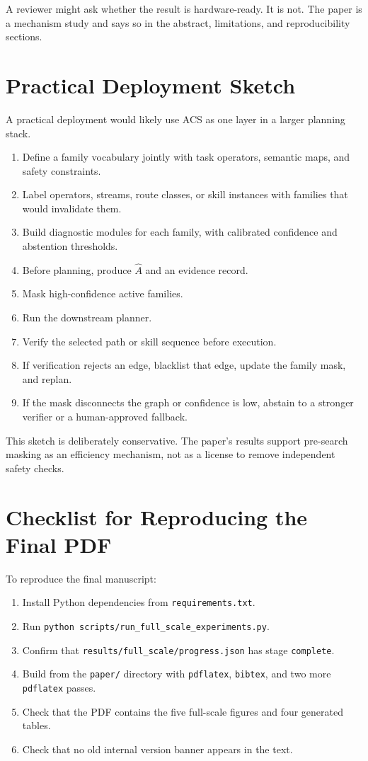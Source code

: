 \documentclass{article}
\newcommand{\ACS}{\textsc{ACS}}
\newcommand{\Ahat}{\hat{A}}
\begin{document}
A reviewer might ask whether the result is hardware-ready. It is not. The paper is a mechanism study and says so in the abstract, limitations, and reproducibility sections.

\section{Practical Deployment Sketch}

A practical deployment would likely use \ACS{} as one layer in a larger planning stack.
\begin{enumerate}
    \item Define a family vocabulary jointly with task operators, semantic maps, and safety constraints.
    \item Label operators, streams, route classes, or skill instances with families that would invalidate them.
    \item Build diagnostic modules for each family, with calibrated confidence and abstention thresholds.
    \item Before planning, produce $\Ahat$ and an evidence record.
    \item Mask high-confidence active families.
    \item Run the downstream planner.
    \item Verify the selected path or skill sequence before execution.
    \item If verification rejects an edge, blacklist that edge, update the family mask, and replan.
    \item If the mask disconnects the graph or confidence is low, abstain to a stronger verifier or a human-approved fallback.
\end{enumerate}
This sketch is deliberately conservative. The paper's results support pre-search masking as an efficiency mechanism, not as a license to remove independent safety checks.

\section{Checklist for Reproducing the Final PDF}

To reproduce the final manuscript:
\begin{enumerate}
    \item Install Python dependencies from \texttt{requirements.txt}.
    \item Run \texttt{python scripts/run\_full\_scale\_experiments.py}.
    \item Confirm that \texttt{results/full\_scale/progress.json} has stage \texttt{complete}.
    \item Build from the \texttt{paper/} directory with \texttt{pdflatex}, \texttt{bibtex}, and two more \texttt{pdflatex} passes.
    \item Check that the PDF contains the five full-scale figures and four generated tables.
    \item Check that no old internal version banner appears in the text.
\end{enumerate}
\end{document}
